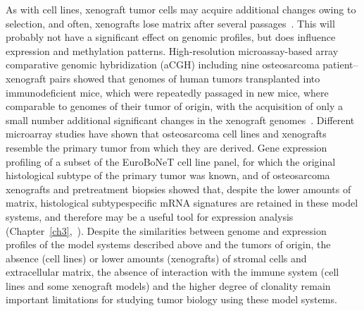 As with cell lines, xenograft tumor cells may acquire additional
changes owing to selection, and often, xenografts lose
matrix after several passages~\cite{mayordomo2010tissue}. This will probably not have a
significant effect on genomic profiles, but does influence
expression and methylation patterns. High\hyp{}resolution microassay\hyp{}based array comparative genomic hybridization
(aCGH) including nine osteosarcoma patient--xenograft pairs
showed that genomes of human tumors transplanted into
immunodeficient mice, which were repeatedly passaged in
new mice, where comparable to genomes of their tumor of
origin, with the acquisition of only a small number additional
significant changes in the xenograft genomes~\cite{kresse2011preclinical}. Different
microarray studies have shown that osteosarcoma cell lines
and xenografts resemble the primary tumor from which they
are derived. Gene expression profiling of a subset of the
EuroBoNeT cell line panel, for which the original histological
subtype of the primary tumor was known, and of osteosarcoma
xenografts and pretreatment biopsies showed that,
despite the lower amounts of matrix, histological subtypespecific
mRNA signatures are retained in these model
systems, and therefore may be a useful tool for expression
analysis (Chapter~\ref{ch3},~\cite{kuijjer2011mrna}). Despite the similarities between genome and
expression profiles of the model systems described above and
the tumors of origin, the absence (cell lines) or lower
amounts (xenografts) of stromal cells and extracellular
matrix, the absence of interaction with the immune system
(cell lines and some xenograft models) and the higher degree
of clonality remain important limitations for studying tumor
biology using these model systems.

